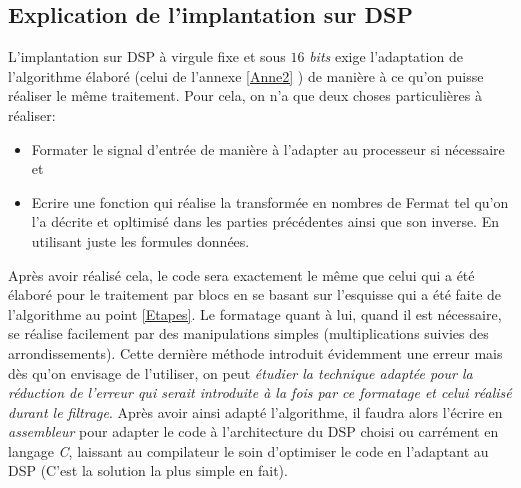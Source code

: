\subsection{Explication de l'implantation sur DSP}
L'implantation sur DSP à virgule fixe et sous $ 16 $ \emph{bits} exige l'adaptation de l'algorithme élaboré (celui de l'annexe \ref{Anne2} ) de manière à ce qu'on puisse réaliser le même traitement. Pour cela, on n'a que deux choses particulières à réaliser:
\begin{itemize}
\item Formater le signal d'entrée de manière à l'adapter au processeur si nécessaire et
\item Ecrire une fonction qui réalise la transformée en nombres de Fermat tel qu'on l'a décrite et opltimisé dans les parties précédentes ainsi que son inverse. En utilisant juste les formules données.
\end{itemize}
Après avoir réalisé cela, le code sera exactement le même que celui qui a été élaboré pour le traitement par blocs en se basant sur l'esquisse qui a été faite de l'algorithme au point \ref{Etapes}. Le formatage quant à lui, quand il est nécessaire, se réalise facilement par des manipulations simples (multiplications suivies des arrondissements). Cette dernière méthode introduit évidemment une erreur mais dès qu'on envisage de l'utiliser, on peut \emph{étudier la technique adaptée pour la réduction de l'erreur qui serait introduite à la fois par ce formatage et celui réalisé durant le filtrage}. Après avoir ainsi adapté l'algorithme, il faudra alors l'écrire en \emph{assembleur} pour adapter le code à l'architecture du DSP choisi ou carrément en langage \emph{C}, laissant au compilateur le soin d'optimiser le code en l'adaptant au DSP (C'est la solution la plus simple en fait).\newpage

